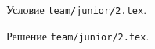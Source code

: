 \problem
Условие \texttt{team/junior/2.tex}.

\solution Решение \texttt{team/junior/2.tex}.
\endproblem
